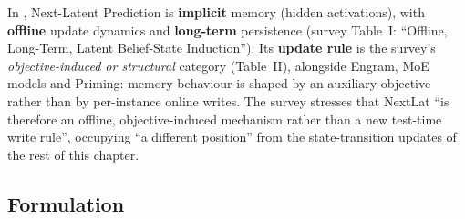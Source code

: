\begin{taxonomy}
In \citet{zhoubian2026memory}, Next-Latent Prediction is \textbf{implicit} memory (hidden activations),
with \textbf{offline} update dynamics and \textbf{long-term} persistence (survey Table~I: ``Offline,
Long-Term, Latent Belief-State Induction''). Its \textbf{update rule} is the survey's
\emph{objective-induced or structural} category (Table~II), alongside Engram, MoE models and
Priming: memory behaviour is shaped by an auxiliary objective rather than by per-instance online
writes. The survey stresses that NextLat ``is therefore an offline, objective-induced mechanism
rather than a new test-time write rule'', occupying ``a different position'' from the
state-transition updates of the rest of this chapter.
\end{taxonomy}

\subsection{Formulation}\label{sec:c08-nextlat-form}

